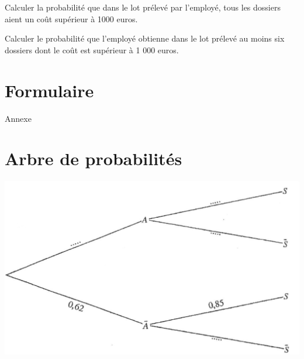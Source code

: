 \documentclass[a4paper,12pt]{scrartcl}
\begin{document}
\question{}
Calculer la probabilité que dans le lot prélevé par l'employé, tous les dossiers aient un coût supérieur à 1000 euros. 


\question{}Calculer le probabilité que l'employé obtienne dans le lot prélevé au moins six dossiers dont le coût est supérieur à 1 000 euros. 




\section*{Formulaire}



 

\cleardoublepage

\begin{center}
 \Huge{Annexe}
\end{center}



\section*{Arbre de probabilités}

\includegraphics[width=\linewidth]{Arbuste.png}
\end{document}
